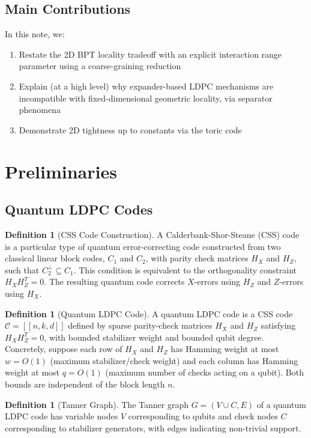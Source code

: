 \documentclass[11pt,a4paper]{article}
\theoremstyle{definition}
\newtheorem{definition}[theorem]{Definition}
\theoremstyle{remark}
\begin{document}
\subsection{Main Contributions}

In this note, we:
\begin{enumerate}
    \item Restate the 2D BPT locality tradeoff with an explicit interaction range parameter using a coarse-graining reduction
    \item Explain (at a high level) why expander-based LDPC mechanisms are incompatible with fixed-dimensional geometric locality, via separator phenomena
    \item Demonstrate 2D tightness up to constants via the toric code
\end{enumerate}

\section{Preliminaries}

\subsection{Quantum LDPC Codes}

\begin{definition}[CSS Code Construction]
A Calderbank-Shor-Steane (CSS) code is a particular type of quantum error-correcting code constructed from two classical linear block codes, $C_1$ and $C_2$, with parity check matrices $H_X$ and $H_Z$, such that $C_2^\perp \subseteq C_1$. This condition is equivalent to the orthogonality constraint $H_X H_Z^T = 0$. The resulting quantum code corrects $X$-errors using $H_Z$ and $Z$-errors using $H_X$.
\end{definition}

\begin{definition}[Quantum LDPC Code]
A quantum LDPC code is a CSS code $\mathcal{C} = [[n, k, d]]$ defined by sparse parity-check matrices $H_X$ and $H_Z$ satisfying $H_X H_Z^T = 0$, with bounded stabilizer weight and bounded qubit degree. Concretely, suppose each row of $H_X$ and $H_Z$ has Hamming weight at most $w=O(1)$ (maximum stabilizer/check weight) and each column has Hamming weight at most $q=O(1)$ (maximum number of checks acting on a qubit). Both bounds are independent of the block length $n$.
\end{definition}

\begin{definition}[Tanner Graph]
The Tanner graph $G = (V \cup C, E)$ of a quantum LDPC code has variable nodes $V$ corresponding to qubits and check nodes $C$ corresponding to stabilizer generators, with edges indicating non-trivial support.
\end{definition}
\end{document}
